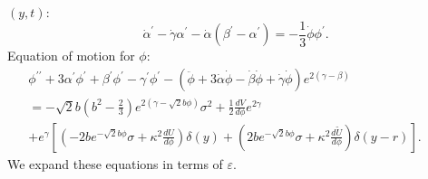 \documentclass[a4paper,11pt]{article}
\begin{document}
$(y, t) : $
\begin{equation}
\dot{\alpha}^{\prime}-\dot{\gamma}\alpha^{\prime}
          -\dot{\alpha}(\beta^{\prime}-\alpha^{\prime})
        =-\frac{1}{3}\dot{\phi}\phi^{\prime}.
\end{equation}
Equation of motion for $\phi : $
\begin{multline}
\phi^{\prime\prime}+3\alpha^{\prime}\phi^{\prime}
          +\beta^{\prime}\phi^{\prime}
           -\gamma^{\prime}\phi^{\prime}
-(\ddot{\phi}+3\dot{\alpha}\dot{\phi}
-\dot{\beta}\dot{\phi}+\dot{\gamma}\dot{\phi})e^{2(\gamma-\beta)} \\
=-\sqrt{2}b\left(b^2-\frac{2}{3}\right)
                          e^{2(\gamma-\sqrt{2}b\phi)}\sigma^2 
+\frac{1}{2}\frac{dV}{d\phi} e^{2\gamma} \hspace{6cm}\\
+e^{\gamma}\left[
 \left(-2be^{-\sqrt{2}b\phi}\sigma
            +\kappa^2 \frac{d U}{d \phi}
 \right)\delta(y)
+\left(2be^{-\sqrt{2}b\phi}\sigma
               +\kappa^2 
           \frac{d \tilde{U}}{d \phi} 
 \right)\delta(y-r)\right].
\label{eq:phi-component}
\end{multline}
We expand these equations in terms of $\varepsilon$.
\end{document}
